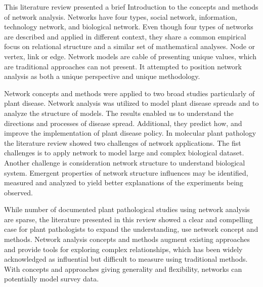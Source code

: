 This literature review presented a brief Introduction to the concepts and methods of network analysis. Networks have four types, social network, information, technology network, and biological network. Even though four types of networks are described and applied in different context, they share a common empirical focus on relational structure and a similar set of mathematical analyses. Node or vertex, link or edge. Network models are cable of presenting unique values, which are traditional approaches can not present. It attempted to position network analysis as both a unique perspective and unique methodology.

Network concepts and methods were applied to two broad studies particularly of plant disease. Network analysis was utilized to model plant disease spreads and to analyze the structure of models. The results enabled us to understand the directions and processes of disease spread. Additional, they   predict how, and improve the implementation of plant disease policy. In molecular plant pathology the literature review showed two challenges of network applications. The fist challenges is to apply network to model large and complex biological dataset. Another challenge is consideration network structure to understand biological system. Emergent properties of network structure influences may be identified, measured and analyzed to yield better explanations of the experiments being observed.

While number of documented plant pathological studies using network analysis are sparse, the literature presented in this review showed a clear and compelling case for plant pathologists to expand the understanding, use network concept and methods. Network analysis concepts and methods augment existing approaches and provide tools for exploring complex relationships, which has been widely acknowledged as influential but difficult to measure using traditional methods. With concepts and approaches giving generality and flexibility, networks can potentially model survey data. 

